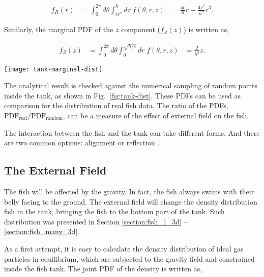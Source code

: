 \documentclass[11pt,twoside]{report}
\begin{document}
$$
\begin{aligned}
f_R(r) &= \int_0^{2\pi}{d \theta} \int_{cr^2}^{h}{dz} \; f(\theta, r, z)
&= \frac{4c}{h} r - \frac{4 c^2}{h^2} r^3.
\end{aligned}
$$

\noindent Similarly, the marginal PDF of the $z$ component ($f_Z(z)$) is written as,

$$
\begin{aligned}
f_Z(z) &= \int_0^{2\pi}{d \theta} \int_0^{\sqrt{h/c}}{dr} \; f(\theta, r, z) 
&= \frac{2}{h^2} z.
\end{aligned}
$$

\begin{SCfigure}
  \texttt{[image: tank-marginal-dist]}
  \caption[The 3D geometry of the experimental fish tank]{The marginal probability density distribution of points sampled uniformly inside the experimental fish tank. Left: the distribution of x component of the points. Center: the distribution the radius in the XY plane. Right: the distribution of the z component of the points.}
  \label{fig:tank-dist}
\end{SCfigure}


\noindent The analytical result is checked against the numerical sampling of random points inside the tank, as shown in Fig.\ \ref{fig:tank-dist}. These PDFs can be used as comparison for the distribution of real fish data. The ratio of the PDFs, $\textrm{PDF}_\textrm{real} / \textrm{PDF}_\textrm{random}$, can be a measure of the effect of external field on the fish.

The interaction between the fish and the tank can take different forms. And there are two common options: alignment or reflection \cite{martinez2018}.

\subsection{The External Field}

The fish will be affected by the gravity. In fact, the fish always swims with their belly facing to the ground. The external field will change the density distribution fish in the tank, bringing the fish to the bottom part of the tank. Such distribution was presented in Section \ref{section:fish_1_3d} -- \ref{section:fish_many_3d}.

As a first attempt, it is easy to calculate the density distribution of ideal gas particles in equilibrium, which are subjected to the gravity field and constrained inside the fish tank. The joint PDF of the density is written as,
\end{document}
